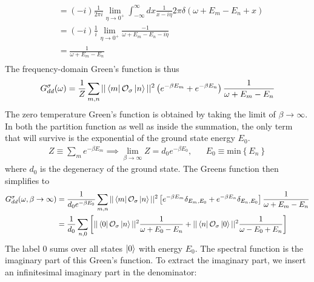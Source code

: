 \documentclass[reprint,hidelinks]{revtex4-2}
\begin{document}
\begin{widetext}
\begin{equation}
\begin{aligned}
									     &=\left(-i\right)\frac{1}{2\pi i}\lim_{\eta \to 0^+} \int_{-\infty}^\infty dx\frac{1}{x- i\eta} 2\pi \delta\left( \omega + E_m - E_n + x\right) \\
									     &=\left(-i\right)\frac{1}{i}\lim_{\eta \to 0^+} \frac{-1}{\omega + E_m - E_n- i\eta} \\
									     &=\frac{1}{\omega + E_m - E_n} \\
\end{aligned}\end{equation}
The frequency-domain Green's function is thus
\begin{equation}\begin{aligned}
	G_{d d}^\sigma(\omega) = \frac{1}{Z}\sum_{m,n}||\bra{m}\mathcal{O}_{\sigma}\ket{n}||^2\left( e^{-\beta E_m} + e^{-\beta E_n}\right)\frac{1}{\omega + E_m - E_n}
\end{aligned}\end{equation}
The zero temperature Green's function is obtained by taking the limit of \(\beta \to \infty\). In both the partition function as well as inside the summation, the only term that will survive is the exponential of the ground state energy \(E_0\).
\begin{equation*}\begin{aligned}
	Z \equiv \sum_m e^{-\beta E_m} \implies \lim_{\beta \to \infty}Z = d_0 e^{-\beta E_0}, && E_0 \equiv \text{min}\left\{ E_n \right\} 
\end{aligned}\end{equation*}
where \(d_0\) is the degeneracy of the ground state. The Greens function then simplifies to
\begin{equation}\begin{aligned}
	\label{Gf_lk}
	G_{d d}^\sigma(\omega, \beta \to \infty) &= \frac{1}{d_0e^{-\beta E_0}}\sum_{m,n}||\bra{m}\mathcal{O}_{\sigma}\ket{n}||^2\left[e^{-\beta E_m}\delta_{E_m, E_0} + e^{-\beta E_n}\delta_{E_n, E_0}\right]\frac{1}{\omega + E_m - E_n}\\
						 &= \frac{1}{d_0}\sum_{n,0}\left[||\bra{0}\mathcal{O}_{\sigma}\ket{n}||^2\frac{1}{\omega + E_0 - E_n} + ||\bra{n}\mathcal{O}_{\sigma}\ket{0}||^2\frac{1}{\omega - E_0 + E_n}\right]\\
\end{aligned}\end{equation}
The label 0 sums over all states \(\ket{0}\) with energy \(E_0\). The spectral function is the imaginary part of this Green's function. To extract the imaginary part, we insert an infinitesimal imaginary part in the denominator:

\end{widetext}
\end{document}
